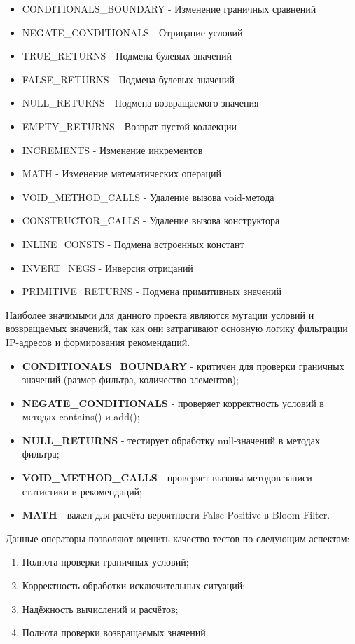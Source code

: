 \begin{itemize}
	\item CONDITIONALS\_BOUNDARY - Изменение граничных сравнений
	\item NEGATE\_CONDITIONALS - Отрицание условий
	\item TRUE\_RETURNS - Подмена булевых значений
	\item FALSE\_RETURNS - Подмена булевых значений
	\item NULL\_RETURNS - Подмена возвращаемого значения
	\item EMPTY\_RETURNS - Возврат пустой коллекции
	\item INCREMENTS - Изменение инкрементов
	\item MATH - Изменение математических операций 
	\item VOID\_METHOD\_CALLS - Удаление вызова void-метода
	\item CONSTRUCTOR\_CALLS - Удаление вызова конструктора
	\item INLINE\_CONSTS - Подмена встроенных констант
	\item INVERT\_NEGS - Инверсия отрицаний
	\item PRIMITIVE\_RETURNS - Подмена примитивных значений
\end{itemize}

Наиболее значимыми для данного проекта являются мутации условий и возвращаемых значений, так как они затрагивают основную логику фильтрации IP-адресов и формирования рекомендаций.

\begin{itemize}
    \item \textbf{CONDITIONALS\_BOUNDARY} - критичен для проверки граничных значений (размер фильтра, количество элементов);
    \item \textbf{NEGATE\_CONDITIONALS} - проверяет корректность условий в методах contains() и add();
    \item \textbf{NULL\_RETURNS} - тестирует обработку null-значений в методах фильтра;
    \item \textbf{VOID\_METHOD\_CALLS} - проверяет вызовы методов записи статистики и рекомендаций;
    \item \textbf{MATH} - важен для расчёта вероятности False Positive в Bloom Filter.
\end{itemize}

\noindent Данные операторы позволяют оценить качество тестов по следующим аспектам:
\begin{enumerate}
    \item Полнота проверки граничных условий;
    \item Корректность обработки исключительных ситуаций;
    \item Надёжность вычислений и расчётов;
    \item Полнота проверки возвращаемых значений.
\end{enumerate}

